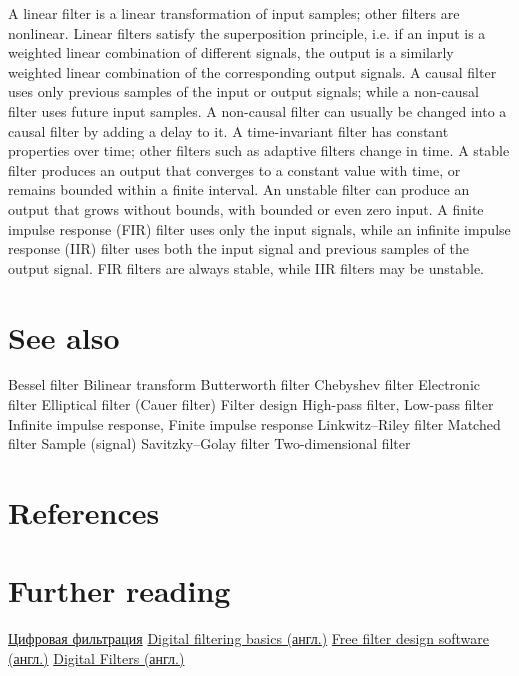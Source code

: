 \documentclass[12pt,a4paper,twocolumn]{scrartcl}
\begin{document}
A linear filter is a linear transformation of input samples; other filters are nonlinear. Linear filters satisfy the superposition principle, i.e. if an input is a weighted linear combination of different signals, the output is a similarly weighted linear combination of the corresponding output signals.
A causal filter uses only previous samples of the input or output signals; while a non-causal filter uses future input samples. A non-causal filter can usually be changed into a causal filter by adding a delay to it.
A time-invariant filter has constant properties over time; other filters such as adaptive filters change in time.
A stable filter produces an output that converges to a constant value with time, or remains bounded within a finite interval. An unstable filter can produce an output that grows without bounds, with bounded or even zero input.
A finite impulse response (FIR) filter uses only the input signals, while an infinite impulse response (IIR) filter uses both the input signal and previous samples of the output signal. FIR filters are always stable, while IIR filters may be unstable.

\section{\centering See also}
Bessel filter
Bilinear transform
Butterworth filter
Chebyshev filter
Electronic filter
Elliptical filter (Cauer filter)
Filter design
High-pass filter, Low-pass filter
Infinite impulse response, Finite impulse response
Linkwitz–Riley filter
Matched filter
Sample (signal)
Savitzky–Golay filter
Two-dimensional filter



\section{\centering References}

\section{\centering Further reading}
\href{https://en.wikipedia.org/wiki/Digital_filter}{Цифровая фильтрация}
\href{https://en.wikipedia.org/wiki/Digital_filter}{Digital filtering basics (англ.)}
\href{https://en.wikipedia.org/wiki/Digital_filter}{Free filter design software (англ.)}
\href{https://en.wikipedia.org/wiki/Digital_filter}{Digital Filters (англ.)}
\end{document}
